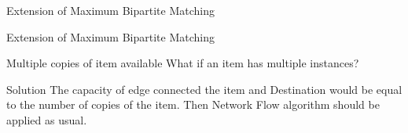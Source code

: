 \documentclass{beamer}
\begin{document}
\begin{frame}{Extension of Maximum Bipartite Matching}
\begin{tikzpicture}
            
            

        \end{tikzpicture}
    
    
\end{frame}
\begin{frame}{Extension of Maximum Bipartite Matching}
    \begin{block}{Multiple copies of item available }
    What if an item has multiple instances?
\end{block}
\pause
    \begin{block}{Solution}
        The capacity of edge connected the item and Destination would be equal to the number of copies of the item. Then Network Flow algorithm should be applied as usual.
    \end{block}
\end{frame}
\end{document}
